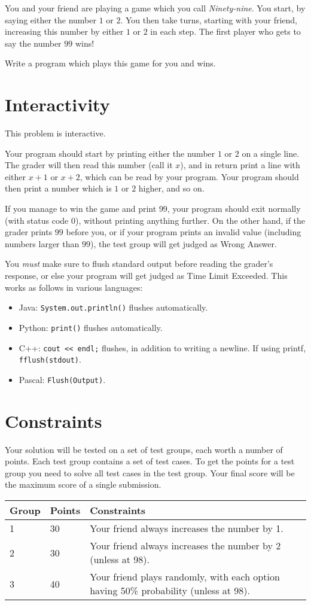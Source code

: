 
You and your friend are playing a game which you call \emph{Ninety-nine}.
You start, by saying either the number $1$ or $2$.
You then take turns, starting with your friend, increasing this number by either $1$ or $2$ in each step.
The first player who gets to say the number $99$ wins!

Write a program which plays this game for you and wins.

\section*{Interactivity}
This problem is interactive.

Your program should start by printing either the number $1$ or $2$ on a single line.
The grader will then read this number (call it $x$), and in return print a line with either $x+1$ or $x+2$, which can be read by your program.
Your program should then print a number which is $1$ or $2$ higher, and so on.

If you manage to win the game and print $99$, your program should exit normally (with status code 0), without printing anything further.
On the other hand, if the grader prints $99$ before you, or if your program prints an invalid value (including numbers larger than $99$), the test group will get judged as Wrong Answer.

You \emph{must} make sure to flush standard output before reading the grader's response, or else your program
will get judged as Time Limit Exceeded. This works as follows in various languages:
\begin{itemize}
  \item Java: \texttt{System.out.println()} flushes automatically.
  \item Python: \texttt{print()} flushes automatically.
  \item C++: \texttt{cout << endl;} flushes, in addition to writing a newline. If using printf, \texttt{fflush(stdout)}.
  \item Pascal: \texttt{Flush(Output)}.
\end{itemize}

\section*{Constraints}
Your solution will be tested on a set of test groups, each worth a number of points.
Each test group contains a set of test cases.
To get the points for a test group you need to solve all test cases in the test group.
Your final score will be the maximum score of a single submission.

\noindent
\begin{tabular}{| l | l | l |}
\hline
Group & Points & Constraints \\ \hline
1     & 30     & Your friend always increases the number by 1. \\ \hline
2     & 30     & Your friend always increases the number by 2 (unless at 98). \\ \hline
3     & 40     & Your friend plays randomly, with each option having 50\% probability (unless at 98). \\ \hline
\end{tabular}
